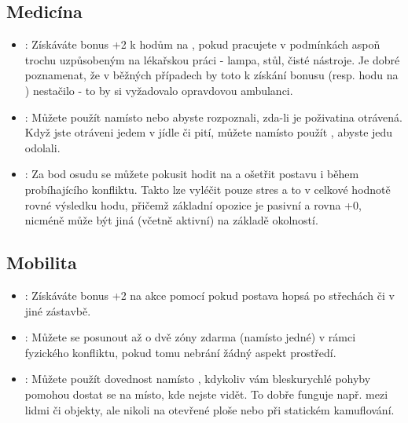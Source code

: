 \documentclass[../main.tex]{subfiles}
\begin{document}
\subsection{Medicína}
\label{sec:trik-medicina}
\begin{itemize}
  
\item{}:
  \label{sec:medicina-ambulance}
Získáváte bonus +2 k hodům na , pokud pracujete v podmínkách aspoň trochu uzpůsobeným na lékařskou práci - lampa, stůl, čisté nástroje. Je dobré poznamenat, že v běžných případech by toto k získání bonusu (resp. hodu na ) nestačilo - to by si vyžadovalo opravdovou ambulanci.

\item{}:
  \label{sec:medicina-vyziva}
Můžete použít  namísto  nebo  abyste rozpoznali, zda-li je poživatina otrávená. Když jste otráveni jedem v jídle či pití, můžete namísto  použít , abyste jedu odolali.

\item{}:
  \label{sec:medicina-boj}
  Za bod osudu se můžete pokusit hodit na  a ošetřit postavu i během probíhajícího konfliktu. Takto lze vyléčit pouze stres a to v celkové hodnotě rovné výsledku hodu, přičemž základní opozice je pasivní a rovna +0, nicméně může být jiná (včetně aktivní) na základě okolností.
\end{itemize}

\subsection{Mobilita}
\label{sec:trik-mobilita}
\begin{itemize}
  
\item{}:
\label{sec:mobilita-parkour}
Získáváte bonus +2 na akce  pomocí  pokud postava hopsá po střechách či v jiné zástavbě.

\item{}:
\label{sec:mobilita-sprinter}
Můžete se posunout až o dvě zóny zdarma (namísto jedné) v rámci fyzického konfliktu, pokud tomu nebrání žádný aspekt prostředí.


\item{}:
\label{sec:mobilita-zmizeni}
Můžete použít dovednost  namísto , kdykoliv vám bleskurychlé pohyby pomohou dostat se na místo, kde nejste vidět. To dobře funguje např. mezi lidmi či objekty, ale nikoli na otevřené ploše nebo při statickém kamuflování.
\end{itemize}
\end{document}
